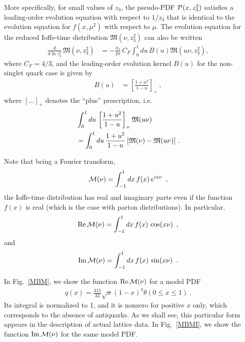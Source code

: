 More specifically, for small values of $z_3$,  the  pseudo-PDF ${\cal P} (x,z_3^2)$
satisfies a  leading-order evolution equation
 with respect to $1/z_3$  that
is identical to  the evolution equation for $f (x,\mu^2)$ with respect to $\mu$.
The  evolution equation
for  the
reduced %
 Ioffe-time distribution ${\mathfrak M} (\nu, z_3^2)$ can also be written    \cite{Radyushkin:2017cyf}
    \begin{align}
    \frac{d}{d \ln z_3^2} \,
{\mathfrak M} (\nu, z_3^2)    &= - \frac{\alpha_s}{2\pi} \, C_F
\int_0^1  du \,   B ( u )   {\mathfrak M} (u \nu, z_3^2)
 ,
\label{EE}
 \end{align}
where  $C_F=4/3$, and the leading-order evolution kernel $B(u)$ for the non-singlet quark case
is given  \cite{Braun:1994jq} by
   \begin{align}
B (u)    &=  \left [ \frac{1+u^2}{1- u} \right ]_+  \
 ,
\label{Bu}
 \end{align}
 where $[ \ldots ]_+$  denotes the  ``plus'' prescription, i.e.
    \begin{align}
& \int_0^1  du \,    \left [ \frac{1+u^2}{1- u} \right ]_+     {\mathfrak M} (u \nu)
\nonumber \\ & =
\int_0^1  du \,  \frac{1+u^2}{1- u} \,    [{\mathfrak M} ( \nu)-{\mathfrak  M} (u \nu)  ]\
 .
\label{plus}
 \end{align}


 Note that being a Fourier  transform,
  \begin{align}
  {\cal M} (\nu)  =
   \int_{-1}^1 dx \, f(x) \,
e^{ix\nu} \,  \  ,
 \label{Mf}
\end{align}
 the Ioffe-time distribution has real and imaginary parts even if the function $f(x)$
 is real (which  is the case with parton distributions). In particular,
   \begin{align}
  {\rm Re} \, {\cal M} (\nu)  =
   \int_{-1}^1 dx \, f(x) \,
\cos (x\nu)  \,  \  ,
 \label{ReMf}
\end{align}
 and
    \begin{align}
  {\rm Im} \, {\cal M} (\nu)  =
   \int_{-1}^1 dx \, f(x) \,
\sin (x\nu)  \,  \  .
 \label{ImMf}
\end{align}



  In \mbox{Fig. \ref{MBM}},  we show the function
  ${\rm Re}  \, {\cal M} (\nu)$ for a model PDF
      \begin{align}
q (x)= \frac{315}{32}  \sqrt{x} (1-x)^3 \theta ( 0\leq x \leq 1) \ .
\end{align}
Its integral is normalized to 1, and it  is nonzero for positive $x$ only,
  which corresponds  to  the absence of antiquarks.
As we shall see, this particular form    appears in the description of   actual  lattice data.
In \mbox{Fig. \ref{MBMI}}, we     show the  function
  ${\rm Im}  \, {\cal M} (\nu)$ for the same  model PDF.


